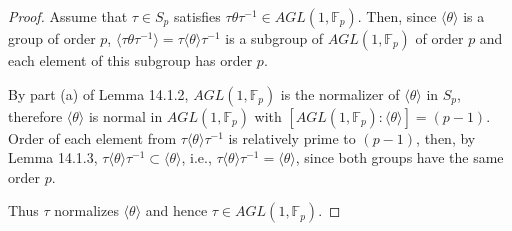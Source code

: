 \documentclass[11pt,a4paper]{article}
\begin{document}
\begin{proof}
Assume that $\tau\in S_p$ satisfies $\tau\theta\tau^{-1}\in AGL(1,\mathbb{F}_p)$. Then, since $\langle\theta\rangle$ is a group of order $p$, $\langle\tau\theta\tau^{-1}\rangle=\tau\langle\theta\rangle\tau^{-1}$ is a subgroup of $AGL(1,\mathbb{F}_p)$ of order $p$ and each element of this subgroup has order $p$.

By part (a) of Lemma 14.1.2, $AGL(1,\mathbb{F}_p)$ is the normalizer of $\langle\theta\rangle$ in $S_p$, therefore $\langle\theta\rangle$ is normal in $AGL(1,\mathbb{F}_p)$ with $[AGL(1,\mathbb{F}_p):\langle\theta\rangle]=(p-1)$. Order of each element from $\tau\langle\theta\rangle\tau^{-1}$ is relatively prime to $(p-1)$, then, by Lemma 14.1.3, $\tau\langle\theta\rangle\tau^{-1}\subset\langle\theta\rangle$, i.e., $\tau\langle\theta\rangle\tau^{-1}=\langle\theta\rangle$, since both groups have the same order $p$.  

Thus $\tau$ normalizes $\langle\theta\rangle$ and hence $\tau\in AGL(1,\mathbb{F}_p)$.
\end{proof}
\end{document}
